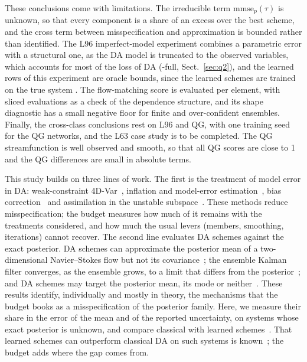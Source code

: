 These conclusions come with limitations. The irreducible term $\mathrm{mmse}_p(\tau)$ is
unknown, so that every component is a share of an excess over the best scheme, and the cross
term between misspecification and approximation is bounded rather than identified. The L96
imperfect-model experiment combines a parametric error with a structural one, as the DA model
is truncated to the observed variables, which accounts for most of the loss of DA (\So-full,
Sect.~\ref{sec:q2}), and the learned rows of this
experiment are oracle bounds, since the learned schemes are trained on the true system
. The flow-matching score is evaluated per element, with
sliced evaluations as a check of the dependence structure, and its shape diagnostic has a small
negative floor for finite and over-confident ensembles. Finally, the cross-class conclusions
rest on L96 and QG, with one training seed for the QG networks, and the L63 case study is to
be completed. The QG streamfunction is well observed and smooth, so that all QG scores are close
to 1 and the QG differences are small in absolute terms.

This study builds on three lines of work. The first is the treatment of model error in DA:
weak-constraint 4D-Var~\cite{tremolet_accounting_2006,laloyaux_exploring_2020}, inflation and
model-error estimation~\cite{whitaker_evaluating_2012,raanes_adaptive_2019,carrassi_data_2018,farchi_using_2021},
bias correction~\cite{dee_bias_2005} and assimilation in the unstable
subspace~\cite{trevisan_assimilation_2004,bocquet_four-dimensional_2017}. These methods reduce
misspecification; the budget measures how much of it remains with the treatments considered, and
how much the usual levers (members, smoothing, iterations) cannot recover. The second line
evaluates DA schemes against the exact posterior. DA schemes can approximate the posterior mean
of a two-dimensional Navier--Stokes flow but not its covariance~\cite{law_evaluating_2012}; the
ensemble Kalman filter converges, as the ensemble grows, to a limit that differs from the
posterior~\cite{ernst_analysis_2015}; and DA schemes may target the posterior mean, its mode or
neither~\cite{hodyss_what_2016}. These results identify, individually and mostly in theory, the
mechanisms that the budget books as a misspecification of the posterior family. Here, we measure
their share in the error of the mean and of the reported uncertainty, on systems whose exact
posterior is unknown, and compare classical with learned
schemes~\cite{brajard_combining_2021,bocquet_bayesian_2020,fablet_learning_2021,mccabe_learning_2021,boudier_data_2023,bocquet_accurate_2024,rozet_score-based_2023,rozet_learning_2024,bao_ensemble_2024}.
That learned schemes can outperform classical DA on such systems is
known~\cite{mccabe_learning_2021,bocquet_accurate_2024}; the budget adds where the gap comes from.

